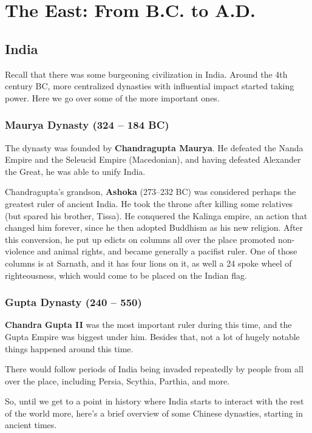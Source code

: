 \chapter{The East: From B.C. to A.D.}

\section{India}

Recall that there was some burgeoning civilization in India.
Around the 4th century BC, more centralized dynasties with influential impact started taking power.
Here we go over some of the more important ones.

\subsection*{Maurya Dynasty (324 -- 184 BC)}

The dynasty was founded by \textbf{Chandragupta Maurya}.
He defeated the Nanda Empire and the Seleucid Empire (Macedonian),
and having defeated Alexander the Great, he was able to unify India.

Chandragupta's grandson,
\textbf{Ashoka} (273--232 BC) was considered perhaps the greatest ruler of ancient India.
He took the throne after killing some relatives (but spared his brother, Tissa).
He conquered the Kalinga empire, an action that changed him forever,
since he then adopted Buddhism as his new religion.
After this conversion, he put up edicts on columns all over the place
promoted non-violence and animal rights,
and became generally a pacifist ruler.
One of those columns is at Sarnath, and it has four lions on it,
as well a 24 spoke wheel of righteousness, which would come to be placed on the Indian flag.

\subsection*{Gupta Dynasty (240 -- 550)}

\textbf{Chandra Gupta II} was the most important ruler during this time,
and the Gupta Empire was biggest under him.
Besides that, not a lot of hugely notable things happened around this time.

There would follow periods of India being invaded repeatedly by people from
all over the place, including Persia, Scythia, Parthia, and more.

So, until we get to a point in history where India starts to interact with the
rest of the world more, here's a brief overview of some Chinese dynasties, starting in ancient times.

